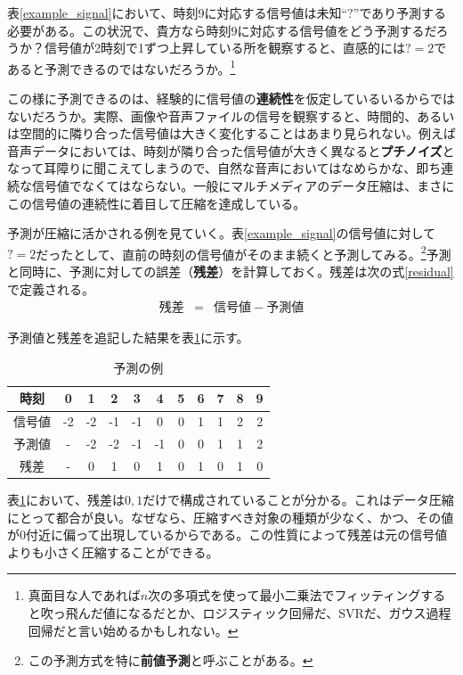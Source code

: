 \documentclass[uplatex,dvipdfmx,b5j,10pt]{jsbook}
\theoremstyle{definition}
\begin{document}
表\ref{example_signal}において、時刻$9$に対応する信号値は未知``$?$''であり予測する必要がある。この状況で、貴方なら時刻$9$に対応する信号値をどう予測するだろうか？信号値が2時刻で1ずつ上昇している所を観察すると、直感的には$?=2$であると予測できるのではないだろうか。\footnote{真面目な人であれば$n$次の多項式を使って最小二乗法でフィッティングすると吹っ飛んだ値になるだとか、ロジスティック回帰だ、SVRだ、ガウス過程回帰だと言い始めるかもしれない。}

この様に予測できるのは、経験的に信号値の\textbf{連続性}を仮定しているいるからではないだろうか。実際、画像や音声ファイルの信号を観察すると、時間的、あるいは空間的に隣り合った信号値は大きく変化することはあまり見られない。例えば音声データにおいては、時刻が隣り合った信号値が大きく異なると\textbf{プチノイズ}となって耳障りに聞こえてしまうので、自然な音声においてはなめらかな、即ち連続な信号値でなくてはならない。一般にマルチメディアのデータ圧縮は、まさにこの信号値の連続性に着目して圧縮を達成している。

予測が圧縮に活かされる例を見ていく。表\ref{example_signal}の信号値に対して$?=2$だったとして、直前の時刻の信号値がそのまま続くと予測してみる。\footnote{この予測方式を特に\textbf{前値予測}と呼ぶことがある。}予測と同時に、予測に対しての誤差（\textbf{残差}）を計算しておく。残差は次の式\ref{residual}で定義される。
\begin{eqnarray}
  残差 &=& 信号値 - 予測値 \label{residual}
\end{eqnarray}

予測値と残差を追記した結果を表\ref{example_signal_predict}に示す。
\begin{table}[htbp]
  \begin{center}
    \caption{予測の例} \label{example_signal_predict}
    \begin{tabular}{|c|c|c|c|c|c|c|c|c|c|c|}
      \hline
      時刻   &  0 &  1 &  2 &  3 &  4 & 5 & 6 & 7 & 8 & 9 \\ \hline
      信号値 & -2 & -2 & -1 & -1 &  0 & 0 & 1 & 1 & 2 & 2 \\ \hline
      予測値 &  - & -2 & -2 & -1 & -1 & 0 & 0 & 1 & 1 & 2 \\ \hline
      残差   &  - &  0 &  1 &  0 &  1 & 0 & 1 & 0 & 1 & 0 \\ \hline
    \end{tabular}
  \end{center}
\end{table}

表\ref{example_signal_predict}において、残差は$0,1$だけで構成されていることが分かる。これはデータ圧縮にとって都合が良い。なぜなら、圧縮すべき対象の種類が少なく、かつ、その値が0付近に偏って出現しているからである。この性質によって残差は元の信号値よりも小さく圧縮することができる。
\end{document}
